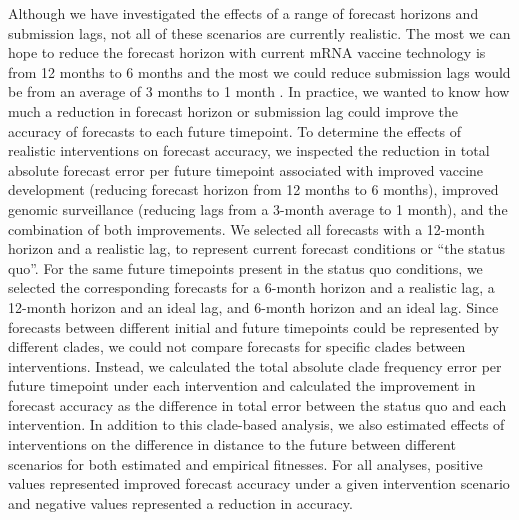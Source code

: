 \documentclass[9pt,lineno]{elife}
\begin{document}
Although we have investigated the effects of a range of forecast horizons and submission lags, not all of these scenarios are currently realistic.
The most we can hope to reduce the forecast horizon with current mRNA vaccine technology is from 12 months to 6 months and the most we could reduce submission lags would be from an average of 3 months to 1 month \citep{Grant2023}.
In practice, we wanted to know how much a reduction in forecast horizon or submission lag could improve the accuracy of forecasts to each future timepoint.
To determine the effects of realistic interventions on forecast accuracy, we inspected the reduction in total absolute forecast error per future timepoint associated with improved vaccine development (reducing forecast horizon from 12 months to 6 months), improved genomic surveillance (reducing lags from a 3-month average to 1 month), and the combination of both improvements.
We selected all forecasts with a 12-month horizon and a realistic lag, to represent current forecast conditions or ``the status quo''.
For the same future timepoints present in the status quo conditions, we selected the corresponding forecasts for a 6-month horizon and a realistic lag, a 12-month horizon and an ideal lag, and 6-month horizon and an ideal lag.
Since forecasts between different initial and future timepoints could be represented by different clades, we could not compare forecasts for specific clades between interventions.
Instead, we calculated the total absolute clade frequency error per future timepoint under each intervention and calculated the improvement in forecast accuracy as the difference in total error between the status quo and each intervention.
In addition to this clade-based analysis, we also estimated effects of interventions on the difference in distance to the future between different scenarios for both estimated and empirical fitnesses.
For all analyses, positive values represented improved forecast accuracy under a given intervention scenario and negative values represented a reduction in accuracy.
\end{document}
